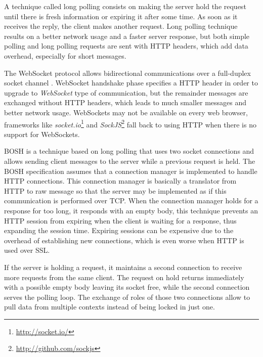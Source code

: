 A technique called long polling consists on making the server hold the request until there is fresh information or expiring it after some time.
As soon as it receives the reply, the client makes another request. Long polling technique results on a better network usage and a faster server response, but both simple polling and long polling requests are sent with \ac{HTTP} headers, which add data overhead, especially for short messages.

The WebSocket protocol allows bidirectional communications over a full-duplex socket channel \cite{rfc6455}.
WebSocket handshake phase specifies a \ac{HTTP} header in order to upgrade to \emph{WebSocket} type of communication, but the remainder messages are exchanged without \ac{HTTP} headers, which leads to much smaller messages and better network usage. WebSockets may not be available on every web browser, frameworks like \emph{socket.io}\footnote{\url{http://socket.io/}} and \emph{SockJS}\footnote{\url{http://github.com/sockjs}} fall back to using \ac{HTTP} when there is no support for WebSockets. 

  \ac{BOSH}\cite{xep0124} is a technique based on long polling that uses two socket connections and allows sending client messages to the server while a previous request is held.
  The \ac{BOSH} specification assumes that a connection manager is implemented to handle \ac{HTTP} connections. This connection manager is basically a translator from \ac{HTTP} to raw message so that the server may be implemented as if this communication is performed over \ac{TCP}.
  When the connection manager holds for a response for too long, it responds with an empty body, this technique prevents an \ac{HTTP} session from expiring when the client is waiting for a response, thus expanding the session time. Expiring sessions can be expensive due to the overhead of establishing new connections, which is even worse when \ac{HTTP} is used over \ac{SSL}.

  If the server is holding a request, it maintains a second connection to receive more requests from the same client. The request on hold returns immediately with a possible empty body leaving its socket free, while the second connection serves the polling loop. The exchange of roles of those two connections allow to pull data from multiple contexts instead of being locked in just one.

